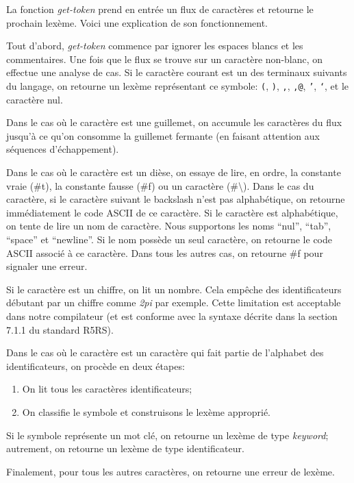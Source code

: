 \documentclass[11pt]{report}
\begin{document}
La fonction \emph{get-token} prend en entrée un flux de caractères et
retourne le prochain lexème.  Voici une explication de son
fonctionnement.

Tout d'abord, \emph{get-token} commence par ignorer les espaces blancs
et les commentaires.  Une fois que le flux se trouve sur un caractère
non-blanc, on effectue une analyse de cas.  Si le caractère courant
est un des terminaux suivants du langage, on retourne un lexème
représentant ce symbole: \texttt{(}, \texttt{)}, \texttt{,},
\texttt{,@}, \texttt{'}, \texttt{`}, et le caractère nul.

Dans le cas où le caractère est une guillemet, on accumule les
caractères du flux jusqu'à ce qu'on consomme la guillemet fermante (en
faisant attention aux séquences d'échappement).

Dans le cas où le caractère est un dièse, on essaye de lire, en ordre,
la constante vraie (\#t), la constante fausse (\#f) ou un caractère
(\#\textbackslash).  Dans le cas du caractère, si le caractère suivant
le backslash n'est pas alphabétique, on retourne immédiatement le code
ASCII de ce caractère.  Si le caractère est alphabétique, on tente de
lire un nom de caractère.  Nous supportons les noms ``nul'', ``tab'',
``space'' et ``newline''.  Si le nom possède un seul caractère, on
retourne le code ASCII associé à ce caractère.  Dans tous les autres
cas, on retourne \#f pour signaler une erreur.

Si le caractère est un chiffre, on lit un nombre.  Cela empêche des
identificateurs débutant par un chiffre comme \emph{2pi} par exemple.
Cette limitation est acceptable dans notre compilateur (et est
conforme avec la syntaxe décrite dans la section 7.1.1 du standard
R5RS).

Dans le cas où le caractère est un caractère qui fait partie de
l'alphabet des identificateurs, on procède en deux étapes:

\begin{enumerate}
\item On lit tous les caractères identificateurs;
\item On classifie le symbole et construisons le lexème approprié.
\end{enumerate}

Si le symbole représente un mot clé, on retourne un lexème de type
\emph{keyword}; autrement, on retourne un lexème de type
identificateur.

Finalement, pour tous les autres caractères, on retourne une erreur de
lexème.
\end{document}
